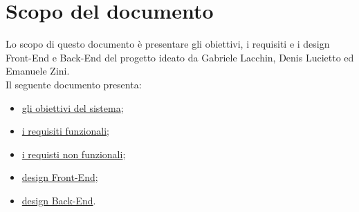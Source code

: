 \section*{Scopo del documento}
Lo scopo di questo documento è presentare gli obiettivi, i requisiti e i design Front-End e Back-End del progetto \nome ideato da Gabriele Lacchin, Denis Lucietto ed Emanuele Zini.\\
Il seguente documento presenta:
\begin{itemize}
    \item \hyperref[sec:ObiettiviProgetto]{gli obiettivi del sistema};
    \item \hyperref[sec:RequisitiFunzionali]{i requisiti funzionali};
    \item \hyperref[sec:RequisitiNonFunzionali]{i requisti non funzionali};
    \item \hyperref[sec:RequisitiFrontEnd]{design Front-End};
    \item \hyperref[sec:RequisitiBackEnd]{design Back-End}.
\end{itemize}